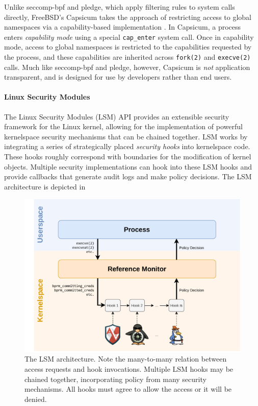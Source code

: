 \documentclass[dvipsnames, 12pt]{article}
\begin{document}
Unlike seccomp-bpf and pledge, which apply filtering rules to system calls
directly, FreeBSD's Capsicum takes the approach of restricting access to global
namespaces via a capability-based implementation \cite{watson2010_capsicum}. In
Capsicum, a process enters \textit{capability mode}  using a special
\texttt{cap\_enter} system call. Once in capability mode, access to global
namespaces is restricted to the capabilities requested by the process, and these
capabilities are inherited across \texttt{fork(2)} and \texttt{execve(2)} calls.
Much like seccomp-bpf and pledge, however, Capsicum is \textit{not} application
transparent, and is designed for use by developers rather than end users.

\paragraph*{Linux Security Modules}
The Linux Security Modules (LSM) API \cite{wright2002_lsm} provides an
extensible security framework for the Linux kernel, allowing for the
implementation of powerful kernelspace security mechanisms that can be chained
together. LSM works by integrating a series of strategically placed
\textit{security hooks} into kernelspace code. These hooks roughly correspond
with boundaries for the modification of kernel objects. Multiple security
implementations can hook into these LSM hooks and provide callbacks that
generate audit logs and make policy decisions. The LSM architecture is
depicted in 

\begin{figure}[htpb]
    \centering
    \includegraphics[width=0.8\linewidth]{figs/lsm.pdf}
    \caption{The LSM architecture. Note the many-to-many relation between access
    requests and hook invocations. Multiple LSM hooks may be chained together,
    incorporating policy from many security mechanisms. All hooks must agree to
    allow the access or it will be denied.}%
    \label{fig:lsm}
\end{figure}
\end{document}

